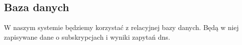 \subsection{Baza danych}

\hspace{0.5cm} W naszym systemie będziemy korzystać z relacyjnej bazy danych.
Będą w niej zapisywane dane o subskrypcjach i wyniki zapytań dns.
